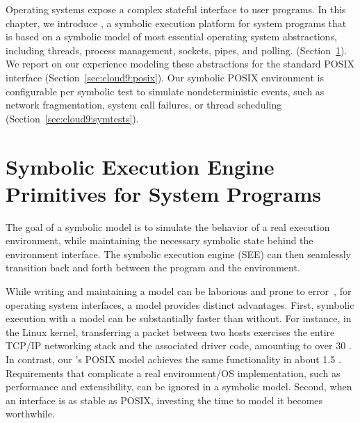 
Operating systems expose a complex stateful interface to user programs.
%
In this chapter, we introduce \cnine, a symbolic execution platform for system programs that is based on a symbolic model of most essential operating system abstractions, including threads, process management, sockets, pipes, and polling. (Section~\ref{sec:cloud9:primitives}).
%
We report on our experience modeling these abstractions for the standard POSIX interface (Section~\ref{sec:cloud9:posix}).
%
Our symbolic POSIX environment is configurable per symbolic test to simulate nondeterministic events, such as network fragmentation, system call failures, or thread scheduling (Section~\ref{sec:cloud9:symtests}).


\section{Symbolic Execution Engine Primitives for System Programs}
\label{sec:cloud9:primitives}

The goal of a symbolic model is to simulate the behavior of a real execution environment, while maintaining the necessary symbolic state behind the environment interface.
%
The symbolic execution engine (SEE) can then seamlessly transition back and forth between the program and the environment.

While writing and maintaining a model can be laborious and prone to error~\cite{s2eSystem}, for operating system interfaces, a model provides distinct advantages.
%
First, symbolic execution with a model can be substantially faster than without.  For instance, in the Linux kernel, transferring a packet between two hosts exercises the entire TCP/IP networking stack and the associated driver code, amounting to over 30 \kloc.  In contrast, our \cnine's POSIX model achieves the same functionality in about 1.5 \kloc. Requirements that complicate a real environment/OS implementation, such as performance and extensibility, can be ignored in a symbolic model.
%
Second, when an interface is as stable as POSIX, investing the time to model it becomes worthwhile.

